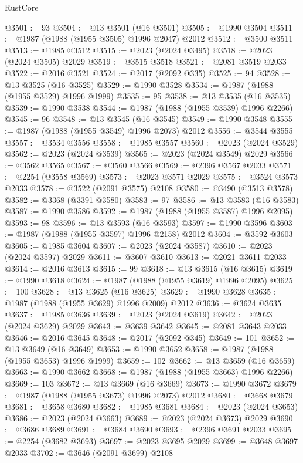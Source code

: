 \begin{lexlean}{RustCore}
\begin{coremodule}
@3501 := 93
@3504 := @13 @3501 (@16 @3501)
@3505 := @1990 @3504
@3511 := @1987 (@1988 (@1955 @3505) @1996 @2047) @2012
@3512 := @3500 @3511
@3513 := @1985 @3512
@3515 := @2023 (@2024 @3495)
@3518 := @2023 (@2024 @3505) @2029
@3519 := @3515 @3518
@3521 := @2081 @3519 @2033
@3522 := @2016 @3521
@3524 := @2017 (@2092 @335)
@3525 := 94
@3528 := @13 @3525 (@16 @3525)
@3529 := @1990 @3528
@3534 := @1987 (@1988 (@1955 @3529) @1996 @1999)
@3535 := 95
@3538 := @13 @3535 (@16 @3535)
@3539 := @1990 @3538
@3544 := @1987 (@1988 (@1955 @3539) @1996 @2266)
@3545 := 96
@3548 := @13 @3545 (@16 @3545)
@3549 := @1990 @3548
@3555 := @1987 (@1988 (@1955 @3549) @1996 @2073) @2012
@3556 := @3544 @3555
@3557 := @3534 @3556
@3558 := @1985 @3557
@3560 := @2023 (@2024 @3529)
@3562 := @2023 (@2024 @3539)
@3565 := @2023 (@2024 @3549) @2029
@3566 := @3562 @3565
@3567 := @3560 @3566
@3569 := @2396 @3567 @2033
@3571 := @2254 (@3558 @3569)
@3573 := @2023 @3571 @2029
@3575 := @3524 @3573 @2033
@3578 := @3522 (@2091 @3575) @2108
@3580 := @3490 (@3513 @3578)
@3582 := @3368 (@3391 @3580)
@3583 := 97
@3586 := @13 @3583 (@16 @3583)
@3587 := @1990 @3586
@3592 := @1987 (@1988 (@1955 @3587) @1996 @2095)
@3593 := 98
@3596 := @13 @3593 (@16 @3593)
@3597 := @1990 @3596
@3603 := @1987 (@1988 (@1955 @3597) @1996 @2158) @2012
@3604 := @3592 @3603
@3605 := @1985 @3604
@3607 := @2023 (@2024 @3587)
@3610 := @2023 (@2024 @3597) @2029
@3611 := @3607 @3610
@3613 := @2021 @3611 @2033
@3614 := @2016 @3613
@3615 := 99
@3618 := @13 @3615 (@16 @3615)
@3619 := @1990 @3618
@3624 := @1987 (@1988 (@1955 @3619) @1996 @2095)
@3625 := 100
@3628 := @13 @3625 (@16 @3625)
@3629 := @1990 @3628
@3635 := @1987 (@1988 (@1955 @3629) @1996 @2009) @2012
@3636 := @3624 @3635
@3637 := @1985 @3636
@3639 := @2023 (@2024 @3619)
@3642 := @2023 (@2024 @3629) @2029
@3643 := @3639 @3642
@3645 := @2081 @3643 @2033
@3646 := @2016 @3645
@3648 := @2017 (@2092 @345)
@3649 := 101
@3652 := @13 @3649 (@16 @3649)
@3653 := @1990 @3652
@3658 := @1987 (@1988 (@1955 @3653) @1996 @1999)
@3659 := 102
@3662 := @13 @3659 (@16 @3659)
@3663 := @1990 @3662
@3668 := @1987 (@1988 (@1955 @3663) @1996 @2266)
@3669 := 103
@3672 := @13 @3669 (@16 @3669)
@3673 := @1990 @3672
@3679 := @1987 (@1988 (@1955 @3673) @1996 @2073) @2012
@3680 := @3668 @3679
@3681 := @3658 @3680
@3682 := @1985 @3681
@3684 := @2023 (@2024 @3653)
@3686 := @2023 (@2024 @3663)
@3689 := @2023 (@2024 @3673) @2029
@3690 := @3686 @3689
@3691 := @3684 @3690
@3693 := @2396 @3691 @2033
@3695 := @2254 (@3682 @3693)
@3697 := @2023 @3695 @2029
@3699 := @3648 @3697 @2033
@3702 := @3646 (@2091 @3699) @2108

\end{coremodule}
\end{lexlean}
